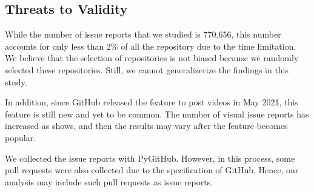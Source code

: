 \subsection{Threats to Validity}
\label{sec:limitation}

While the number of issue reports that we studied is 770,656,  this number accounts for only less than 2\% of all the repository due to the time limitation. 
We believe that the selection of repositories is not biased because we randomly selected these repositories. 
Still, we cannot generalizerize the findings in this study. 

In addition, since GitHub released the feature to post videos in May 2021, this feature is still new and yet to be common. The number of visual issue reports has increased as  shows, and then the results may vary after the feature becomes popular. 

We collected the issue reports with PyGitHub. 
However, in this process, some pull requests were also collected due to the specification of GitHub. 
Hence, our analysis may include such pull requests as issue reports. 